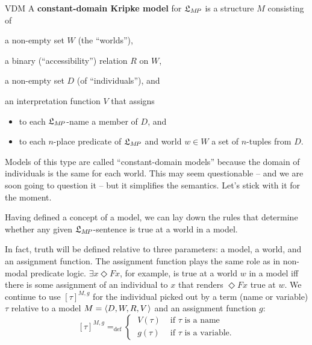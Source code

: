 \begin{definition}{}{VDM}
  A \textbf{constant-domain Kripke model} for $\mathfrak{L}_{M\!P}$ is a structure $M$
  consisting of%
  \medskip
  \begin{compactenum}
    \item a non-empty set $W$ (the ``worlds''),
    \item a binary (``accessibility'') relation $R$ on $W$,
    \item a non-empty set $D$ (of ``individuals''), and
    \item an interpretation function $V$ that assigns%
    \vspace{-1mm}
    \begin{itemize}
      \itemsep-1mm
      \item to each $\mathfrak{L}_{M\!P}$-name a member of $D$, and
      \item to each $n$-place predicate of $\mathfrak{L}_{M\!P}$ and world $w \in W$ a set of
            $n$-tuples from $D$.
    \end{itemize}
  \end{compactenum}
\end{definition}

Models of this type are called ``constant-domain models'' because the domain of
individuals is the same for each world. This may seem questionable -- and we are
soon going to question it -- but it simplifies the semantics. Let’s stick
with it for the moment.

Having defined a concept of a model, we can lay down the rules that determine
whether any given $\mathfrak{L}_{M\!P}$-sentence is true at a world in a model.

In fact, truth will be defined relative to three parameters: a model, a world,
and an assignment function. The assignment function plays the same role as in
non-modal predicate logic. $\exists x \Diamond Fx$, for example, is true at a
world $w$ in a model iff there is some assignment of an individual to $x$ that
renders $\Diamond Fx$ true at $w$. We continue to use $[\tau]^{M,g}$ for the
individual picked out by a term (name or variable) $\tau$ relative to a model
$M = \t{D,W,R,V}$ and an assignment function $g$:
\[
  [\tau]^{M,g} =_\text{def} \begin{cases} \;V(\tau) & \text{ if $\tau$ is a name}\\
    \;g(\tau) & \text{ if $\tau$ is a variable}.
  \end{cases}
\]

